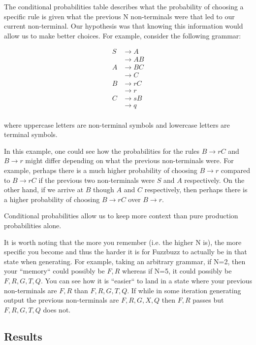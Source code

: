The conditional probabilities table describes what the probability of choosing a
specific rule is given what the previous N non-terminals were that led to our
current non-terminal. Our hypothesis was that knowing this information would
allow us to make better choices. For example, consider the following grammar:

\begin{align*}
S &\rightarrow A \\
&\rightarrow A B \\
A &\rightarrow B C \\
&\rightarrow C \\
B &\rightarrow r C \\
&\rightarrow r \\
C &\rightarrow s B \\
&\rightarrow q \\
\end{align*}

\noindent
where uppercase letters are non-terminal symbols and lowercase letters are
terminal symbols.


In this example, one could see how the probabilities for the rules $B
\rightarrow rC$ and $B \rightarrow r$ might differ depending on what the
previous non-terminals were. For example, perhaps there is a much higher
probability of choosing $B \rightarrow r$ compared to $B \rightarrow rC$ if the
previous two non-terminals were $S$ and $A$ respectively. On the other hand, if
we arrive at $B$ though $A$ and $C$ respectively, then perhaps there is a
higher probability of choosing $B \rightarrow rC$ over $B \rightarrow r$.

Conditional probabilities allow us to keep more context than pure production
probabilities alone.

It is worth noting that the more you remember (i.e. the higher N is), the more
specific you become and thus the harder it is for Fuzzbuzz to actually be in
that state when generating. For example, taking an arbitrary grammar, if N=2,
then your ``memory`` could possibly be $F, R$ whereas if N=5, it could possibly
be $F, R, G, T, Q$. You can see how it is ``easier`` to land in a state where
your previous non-terminals are $F, R$ than $F, R, G, T, Q$. If while in some
iteration generating output the previous non-terminals are $F, R, G, X, Q$ then
$F, R$ passes but $F, R, G, T, Q$ does not.

\subsection{Results}

